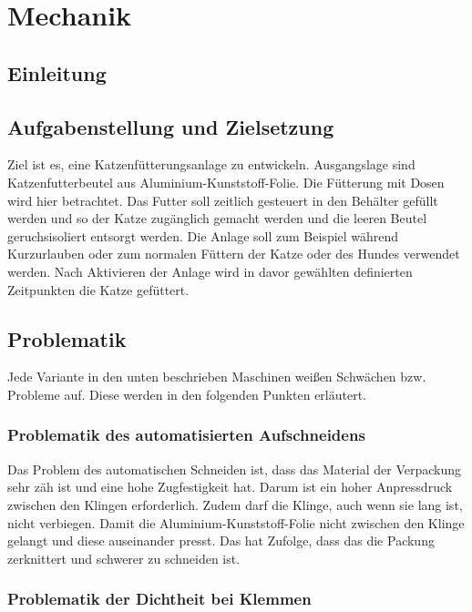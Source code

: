 \chapter{Mechanik}
\section{Einleitung}
\section{Aufgabenstellung und Zielsetzung}

Ziel ist es, eine Katzenfütterungsanlage zu entwickeln. Ausgangslage sind Katzenfutterbeutel aus Aluminium-Kunststoff-Folie. Die Fütterung mit Dosen wird hier betrachtet. Das Futter soll zeitlich gesteuert in den Behälter gefüllt werden und so der Katze zugänglich gemacht werden und die leeren Beutel geruchsisoliert entsorgt werden. Die Anlage soll zum Beispiel während Kurzurlauben oder zum normalen Füttern der Katze oder des Hundes verwendet werden. Nach Aktivieren der Anlage wird in davor gewählten definierten Zeitpunkten die Katze gefüttert. 


\section{Problematik}

Jede Variante in den unten beschrieben Maschinen weißen Schwächen bzw. Probleme auf. Diese werden in den folgenden Punkten erläutert.

\subsection{Problematik des automatisierten Aufschneidens}

Das Problem des automatischen Schneiden ist, dass das Material der Verpackung sehr zäh ist und eine hohe Zugfestigkeit hat. Darum ist ein hoher Anpressdruck zwischen den Klingen erforderlich. Zudem darf die Klinge, auch wenn sie lang ist, nicht verbiegen. Damit die Aluminium-Kunststoff-Folie nicht zwischen den Klinge gelangt und diese auseinander presst. Das hat Zufolge, dass das die Packung zerknittert und schwerer zu schneiden ist. 

\subsection{Problematik der Dichtheit bei Klemmen}

